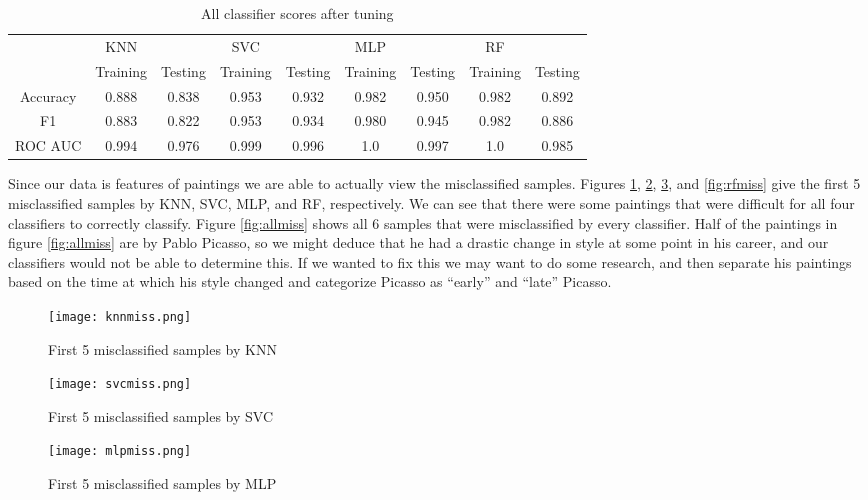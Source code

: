 \documentclass[12pt]{article}
\begin{document}
\begin{table}[h!]
	\centering
	\begin{tabular}{| c|cc|cc|cc|cc|} 
		\hline
		&KNN&&SVC&&MLP&&RF&\\
		& Training & Testing& Training & Testing& Training & Testing& Training & Testing\\ \hline
		Accuracy & 0.888& 0.838 & 0.953 &0.932& 0.982 &0.950 & 0.982 &0.892 \\ 
		F1  &  0.883 &0.822&  0.953 &0.934& 0.980 &0.945& 0.982 &0.886\\ 
		ROC AUC & 0.994 & 0.976 & 0.999 &0.996& 1.0 &0.997& 1.0 &0.985\\
		\hline
	\end{tabular}
	\caption{All classifier scores after tuning}
	\label{table: 10}
\end{table}

\FloatBarrier

Since our data is features of paintings we are able to actually view the misclassified samples. Figures \ref{fig:knnmiss}, \ref{fig:svmmiss}, \ref{fig:mlpmiss}, and \ref{fig:rfmiss} give the first 5 misclassified samples by KNN, SVC, MLP, and RF, respectively. We can see that there were some paintings that were difficult for all four classifiers to correctly classify. Figure \ref{fig:allmiss} shows all 6 samples that were misclassified by every classifier. Half of the paintings in figure \ref{fig:allmiss} are by Pablo Picasso, so we might deduce that he had a drastic change in style at some point in his career, and our classifiers would not be able to determine this. If we wanted to fix this we may want to do some research, and then separate his paintings based on the time at which his style changed and categorize Picasso as ``early'' and ``late'' Picasso.

\begin{figure}[h]
	\centering
	\texttt{[image: knnmiss.png]}
	\caption{First 5 misclassified samples by KNN}
	\label{fig:knnmiss}
\end{figure}

\begin{figure}[h]
	\centering
	\texttt{[image: svcmiss.png]}
	\caption{First 5 misclassified samples by SVC}
	\label{fig:svmmiss}
\end{figure}

\begin{figure}[h]
	\centering
	\texttt{[image: mlpmiss.png]}
	\caption{First 5 misclassified samples by MLP}
	\label{fig:mlpmiss}
\end{figure}
\end{document}
